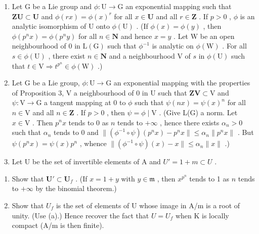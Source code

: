
\begin{enumerate}
\def\labelenumi{\arabic{enumi}.}
\item
  Let \(\mathrm{G}\) be a Lie group and \(\phi: \mathrm{U} \to \mathrm{G}\) an exponential mapping such that \(\mathbf{Z}\mathbf{U} \subset \mathbf{U}\) and \(\phi(rx) = \phi(x)^r\) for all \(x \in \mathbf{U}\) and all \(r \in \mathbf{Z}\) . If \(p > 0\) , \(\phi\) is an analytic isomorphism of \(\mathrm{U}\) onto \(\phi(\mathrm{U})\) . (If \(\phi(x) = \phi(y)\) , then \(\phi(p^n x) = \phi(p^n y)\) for all \(n \in \mathbf{N}\) and hence \(x = y\) . Let \(\mathrm{W}\) be an open neighbourhood of \(0\) in \(\mathrm{L}(\mathrm{G})\) such that \(\phi^{-1}\) is analytic on \(\phi(\mathrm{W})\) . For all \(s \in \phi(\mathrm{U})\) , there exist \(n \in \mathbf{N}\) and a neighbourhood \(\mathrm{V}\) of \(s\) in \(\phi(\mathrm{U})\) such that \(t \in \mathrm{V} \Rightarrow t^{p^n} \in \phi(\mathrm{W})\) .)
\item
  Let G be a Lie group, \(\phi: \mathrm{U} \to \mathrm{G}\) an exponential mapping with the properties of Proposition 3, V a neighbourhood of 0 in U such that \(\mathbf{ZV} \subset \mathrm{V}\) and \(\psi: \mathrm{V} \to \mathrm{G}\) a tangent mapping at 0 to \(\phi\) such that \(\psi(nx) = \psi(x)^n\) for all \(n \in \mathrm{V}\) and all \(n \in \mathbf{Z}\) . If \(p > 0\) , then \(\psi = \phi \mid \mathrm{V}\) . (Give L(G) a norm. Let \(x \in \mathrm{V}\) . Then \(p^n x\) tends to 0 as \(n\) tends to \(+\infty\) , hence there exists \(\alpha_n > 0\) such that \(\alpha_n\) tends to 0 and \(\|(\phi^{-1} \circ \psi)(p^n x) - p^n x \| \leqslant \alpha_n \|p^n x\|\) . But \(\psi(p^n x) = \psi(x)p^n\) , whence \(\|(\phi^{-1} \circ \psi)(x) - x \| \leqslant \alpha_n \|x\|\) .)
\item
  Let U be the set of invertible elements of A and \(U' = 1 + m \subset U\) .
\end{enumerate}

\begin{enumerate}
\def\labelenumi{(\alph{enumi})}
\item
  Show that \(\mathbf{U}' \subset \mathbf{U}_f\) . (If \(x = 1 + y\) with \(y \in \mathfrak{m}\) , then \(x^{p^n}\) tends to 1 as \(n\) tends to \(+\infty\) by the binomial theorem.)
\item
  Show that \(U_{f}\) is the set of elements of U whose image in A/m is a root of unity. (Use (a).) Hence recover the fact that \(U = U_{f}\) when K is locally compact (A/m is then finite).
\end{enumerate}

